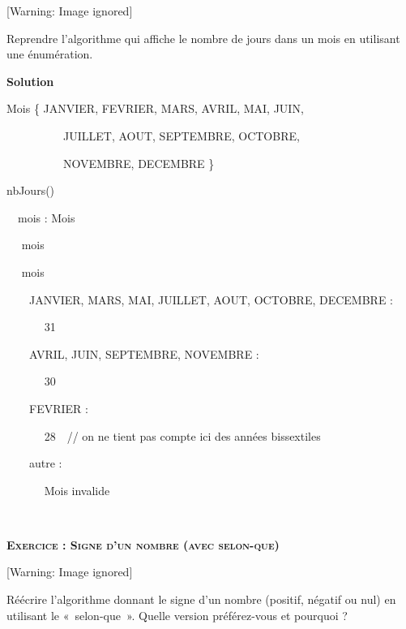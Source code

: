 \begin{center}
 [Warning: Image ignored] %

\end{center}
{
Reprendre l'algorithme qui affiche le nombre de jours
dans un mois en utilisant une énumération.}

{\bfseries
Solution}

{\sffamily
{} Mois \{ JANVIER, FEVRIER, MARS, AVRIL, MAI,
JUIN,}

{\sffamily
\ \ \ \ \ \ \ \ \ \ JUILLET, AOUT, SEPTEMBRE, OCTOBRE,}

{\sffamily
\ \ \ \ \ \ \ \ \ \ NOVEMBRE, DECEMBRE \}}

{\sffamily
{} nbJours()}

{\sffamily
\ \ mois : Mois}

{\sffamily
\ \  mois}

{\sffamily
\ \  mois }

{\sffamily
\ \ \ \ JANVIER, MARS, MAI, JUILLET, AOUT, OCTOBRE, DECEMBRE :}

{\sffamily
\ \ \ \ \ \  31}

{\sffamily
\ \ \ \ AVRIL, JUIN, SEPTEMBRE, NOVEMBRE :}

{\sffamily
\ \ \ \ \ \  30}

{\sffamily
\ \ \ \ FEVRIER :}

{\sffamily
\ \ \ \ \ \  28\ \ // on ne tient pas compte ici
des années bissextiles}

{\sffamily
\ \ \ \ autre :}

{\sffamily
\ \ \ \ \ \   {\textquotedbl} Mois invalide
{\textquotedbl}}

{\sffamily
\ \ \ \ \ \ }

{\sffamily
{} }


\bigskip

{\sffamily\bfseries\scshape
Exercice : Signe d'un nombre (avec selon-que)}

\begin{center}
 [Warning: Image ignored] %

\end{center}
{
Réécrire l'algorithme donnant le signe
d'un nombre (positif, négatif ou nul) en utilisant le
«~selon-que~». Quelle version préférez-vous et pourquoi ?}

